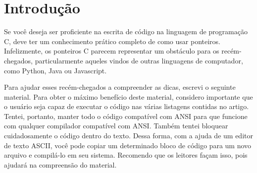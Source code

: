 
\chapter*{Introdução}
Se você deseja ser proficiente na escrita de código na linguagem de programação C, deve ter um conhecimento prático completo de como usar ponteiros. Infelizmente, os ponteiros C parecem representar um obstáculo para os recém-chegados, particularmente aqueles vindos de outras linguagens de computador, como Python, Java ou Javascript.

Para ajudar esses recém-chegados a compreender as dicas, escrevi o seguinte material. Para obter o máximo benefício deste material, considero importante que o usuário seja capaz de executar o código nas várias listagens contidas no artigo. Tentei, portanto, manter todo o código compatível com ANSI para que funcione com qualquer compilador compatível com ANSI. Também tentei bloquear cuidadosamente o código dentro do texto. Dessa forma, com a ajuda de um editor de texto ASCII, você pode copiar um determinado bloco de código para um novo arquivo e compilá-lo em seu sistema. Recomendo que os leitores façam isso, pois ajudará na compreensão do material.

